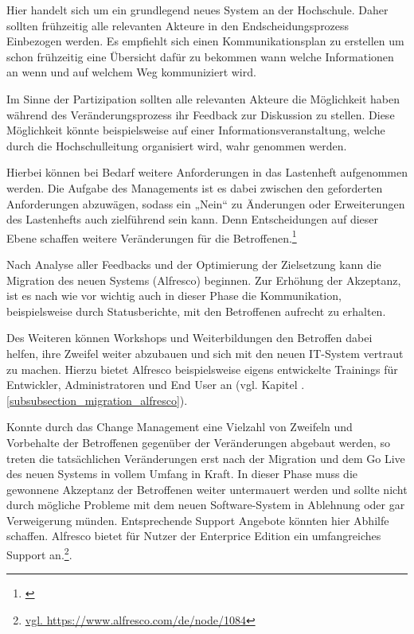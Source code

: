 Hier handelt sich um ein grundlegend neues System an der Hochschule. 
Daher sollten frühzeitig alle relevanten Akteure in den Endscheidungsprozess Einbezogen werden. 
Es empfiehlt sich einen Kommunikationsplan zu erstellen um schon frühzeitig eine Übersicht dafür zu bekommen wann welche Informationen an wenn und auf welchem Weg kommuniziert wird.

Im Sinne der Partizipation sollten alle relevanten Akteure die Möglichkeit haben während des Veränderungsprozess ihr Feedback zur Diskussion zu stellen. Diese Möglichkeit könnte beispielsweise auf einer Informationsveranstaltung, welche durch die Hochschulleitung organisiert wird, wahr genommen werden.

Hierbei können bei Bedarf weitere Anforderungen in das Lastenheft aufgenommen werden. Die Aufgabe des Managements ist es dabei zwischen den geforderten Anforderungen abzuwägen, sodass ein „Nein“ zu Änderungen oder Erweiterungen des Lastenhefts auch zielführend sein kann. Denn Entscheidungen auf dieser Ebene schaffen weitere Veränderungen für die Betroffenen.\footnote{\cite{kleinhesseling_change_2011}}

Nach Analyse aller Feedbacks und der Optimierung der Zielsetzung kann die Migration des neuen Systems (Alfresco) beginnen. Zur Erhöhung der Akzeptanz,  ist es nach wie vor wichtig auch in dieser Phase die Kommunikation, beispielsweise durch Statusberichte, mit den Betroffenen aufrecht zu erhalten.

Des Weiteren können Workshops und Weiterbildungen den Betroffen dabei helfen, ihre Zweifel weiter abzubauen und sich mit den neuen IT-System vertraut zu machen. Hierzu bietet Alfresco beispielsweise eigens entwickelte Trainings für Entwickler, Administratoren und End User an (vgl. Kapitel . \ref{subsubsection_migration_alfresco}).

Konnte durch das Change Management eine Vielzahl von Zweifeln und Vorbehalte der Betroffenen gegenüber der Veränderungen abgebaut werden, so treten die tatsächlichen Veränderungen erst nach der Migration und dem Go Live des neuen Systems in vollem Umfang in Kraft. In dieser Phase muss die gewonnene Akzeptanz der Betroffenen weiter untermauert werden und sollte nicht durch mögliche Probleme mit dem neuen Software-System in Ablehnung oder gar Verweigerung münden. Entsprechende Support Angebote könnten hier Abhilfe schaffen. Alfresco bietet für Nutzer der Enterprice Edition ein umfangreiches  Support an.\footnote{\url{vgl. https://www.alfresco.com/de/node/1084}}.